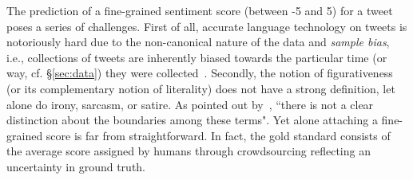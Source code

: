 \documentclass[11pt,letterpaper]{article}
\begin{document}
The prediction of a fine-grained sentiment score (between -5 and 5) for a tweet poses a series of challenges. 
First of all, accurate language technology on tweets is notoriously hard due to the non-canonical nature of the data and \textit{sample bias}, i.e., collections of tweets are inherently biased towards the particular time (or way, cf. \S \ref{sec:data}) they were collected~\cite{Eisenstein:2013,Hovy:ea:2014:LREC}. Secondly, the notion of figurativeness (or its complementary notion of literality) does not have a strong definition, let alone do irony, sarcasm, or satire. As pointed out by~, ``there is not a clear distinction about the boundaries among these terms".  Yet alone attaching a fine-grained score is far from straightforward. In fact, the gold standard consists of the average score assigned by humans through crowdsourcing reflecting an uncertainty in ground truth. %




\end{document}
